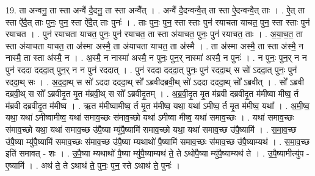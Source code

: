\documentclass[17pt]{extarticle}
\begin{document}
19. ता अन्वनु॒ ता स्ता अन्वै॑ दै॒दनु॒ ता स्ता अन्वै᳚त् । . अन्वै॑ दै॒दन्वन्वै॒त् ता स्ता ऐ॒दन्वन्वै॒त् ताः । . ऐ॒त् ता स्ता ऐ॑दै॒त् ताः पुनः॒ पुन॒ स्ता ऐ॑दै॒त् ताः पुनः॑ । . ताः पुनः॒ पुन॒ स्ता स्ताः पुन॑ रयाचता याचत॒ पुन॒ स्ता स्ताः पुन॑ रयाचत । . पुन॑ रयाचता याचत॒ पुनः॒ पुन॑ रयाचत॒ ता स्ता अ॑याचत॒ पुनः॒ पुन॑ रयाचत॒ ताः । . अ॒या॒च॒त॒ ता स्ता अ॑याचता याचत॒ ता अ॑स्मा अस्मै॒ ता अ॑याचता याचत॒ ता अ॑स्मै । . ता अ॑स्मा अस्मै॒ ता स्ता अ॑स्मै॒ न नास्मै॒ ता स्ता अ॑स्मै॒ न । . अ॒स्मै॒ न नास्मा॑ अस्मै॒ न पुनः॒ पुन॒र् नास्मा॑ अस्मै॒ न पुनः॑ । . न पुनः॒ पुन॒र् न न पुन॑ रददा दददा॒त् पुन॒र् न न पुन॑ रददात् । . पुन॑ रददा दददा॒त् पुनः॒ पुन॑ रददा॒थ् स सो॑ ऽददा॒त् पुनः॒ पुन॑ रददा॒थ् सः । . अ॒द॒दा॒थ् स सो॑ ऽददा दददा॒थ् सो᳚ ऽब्रवीदब्रवी॒थ् सो॑ ऽददा दददा॒थ् सो᳚ ऽब्रवीत् । . सो᳚ ऽब्रवी दब्रवी॒थ् स सो᳚ ऽब्रवीदृ॒त मृ॒त म॑ब्रवी॒थ् स सो᳚ ऽब्रवीदृ॒तम् । . अ॒ब्र॒वी॒दृ॒त मृ॒त म॑ब्रवी दब्रवीदृ॒त म॑मीष्वा मीष्व॒ र्त म॑ब्रवी दब्रवीदृ॒त म॑मीष्व । . ऋ॒त म॑मीष्वामीष्व॒ र्त मृ॒त म॑मीष्व॒ यथा॒ यथा॑ ऽमीष्व॒ र्त मृ॒त म॑मीष्व॒ यथा᳚ । . अ॒मी॒ष्व॒ यथा॒ यथा॑ ऽमीष्वामीष्व॒ यथा॑ समाव॒च्छः स॑माव॒च्छो यथा॑ ऽमीष्वा मीष्व॒ यथा॑ समाव॒च्छः । . यथा॑ समाव॒च्छः स॑माव॒च्छो यथा॒ यथा॑ समाव॒च्छ उ॑पै॒ष्या म्यु॑पै॒ष्यामि॑ समाव॒च्छो यथा॒ यथा॑ समाव॒च्छ उ॑पै॒ष्यामि॑ । . स॒मा॒व॒च्छ उ॑पै॒ष्या म्यु॑पै॒ष्यामि॑ समाव॒च्छः स॑माव॒च्छ उ॑पै॒ष्या म्यथाथो॑ पै॒ष्यामि॑ समाव॒च्छः स॑माव॒च्छ उ॑पै॒ष्याम्यथ॑ । . स॒मा॒व॒च्छ इति॑ समावत् - शः । . उ॒पै॒ष्या म्यथाथो॑ पै॒ष्या म्यु॑पै॒ष्याम्यथ॑ ते॒ ते ऽथो॑पै॒ष्या म्यु॑पै॒ष्याम्यथ॑ ते । . उ॒पै॒ष्यामीत्यु॑प - ए॒ष्यामि॑ । . अथ॑ ते॒ ते ऽथाथ॑ ते॒ पुनः॒ पुन॒ स्ते ऽथाथ॑ ते॒ पुनः॑ । \newline
\end{document}
